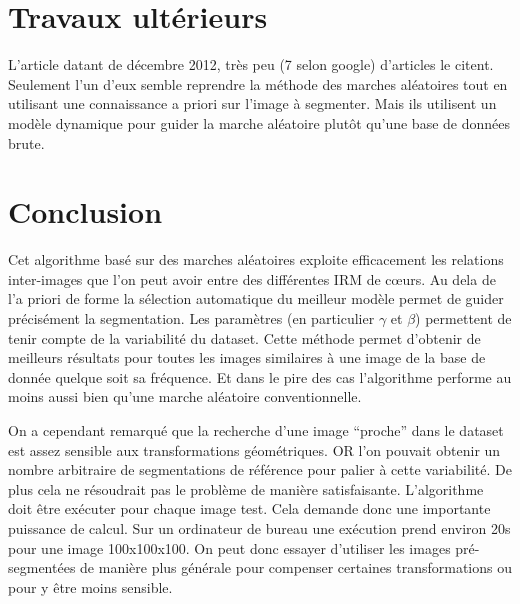 \documentclass{article}
\begin{document}
\section{Travaux ultérieurs}

L’article datant de décembre 2012, très peu (7 selon google) d’articles le citent. Seulement l’un d’eux semble reprendre la méthode des marches aléatoires  tout en utilisant une connaissance a priori sur l’image à segmenter. Mais ils utilisent un modèle dynamique pour guider la marche aléatoire plutôt qu’une base de données brute.


\section{Conclusion}

Cet algorithme basé sur des marches aléatoires exploite efficacement les relations inter-images que l'on peut avoir entre des différentes IRM de cœurs. Au dela de l'a priori de forme la sélection automatique du meilleur modèle permet de guider précisément la segmentation. Les paramètres (en particulier $\gamma$ et $\beta$) permettent de tenir compte de la variabilité du dataset. Cette méthode permet d'obtenir de meilleurs résultats pour toutes les images similaires à une image de la base de donnée quelque soit sa fréquence. Et dans le pire des cas l'algorithme performe au moins aussi bien qu'une marche aléatoire conventionnelle. 

On a cependant remarqué que la recherche d'une image ``proche'' dans le dataset est assez sensible aux transformations géométriques. OR l'on pouvait obtenir un nombre arbitraire de segmentations de référence pour palier à cette variabilité. De plus cela ne résoudrait pas le problème de manière satisfaisante. L'algorithme doit être exécuter pour chaque image test. Cela demande donc une importante puissance de calcul. Sur un ordinateur de bureau une exécution prend environ 20s pour une image 100x100x100. On peut donc essayer d'utiliser les images pré-segmentées de manière plus générale pour compenser certaines transformations ou pour y être moins sensible.
\end{document}
